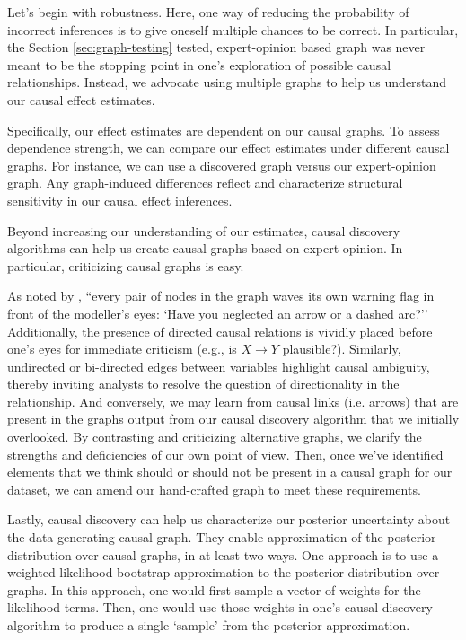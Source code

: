 Let's begin with robustness.
Here, one way of reducing the probability of incorrect inferences is to give oneself multiple chances to be correct.
In particular, the Section \ref{sec:graph-testing} tested, expert-opinion based graph was never meant to be the stopping point in one's exploration of possible causal relationships.
Instead, we advocate using multiple graphs to help us understand our causal effect estimates.

Specifically, our effect estimates are dependent on our causal graphs.
To assess dependence strength, we can compare our effect estimates under different causal graphs.
For instance, we can use a discovered graph versus our expert-opinion graph.
Any graph-induced differences reflect and characterize structural sensitivity in our causal effect inferences.

Beyond increasing our understanding of our estimates, causal discovery algorithms can help us create causal graphs based on expert-opinion.
In particular, criticizing causal graphs is easy.

As noted by \citet[p. 708]{pearl_1995_causal}, ``every pair of nodes in the graph waves its own warning flag in front of the modeller's eyes: `Have you neglected an arrow or a dashed arc?''
Additionally, the presence of directed causal relations is vividly placed before one's eyes for immediate criticism (e.g., is $X \rightarrow Y$ plausible?).
Similarly, undirected or bi-directed edges between variables highlight causal ambiguity, thereby inviting analysts to resolve the question of directionality in the relationship.
And conversely, we may learn from causal links (i.e. arrows) that are present in the graphs output from our causal discovery algorithm that we initially overlooked.
By contrasting and criticizing alternative graphs, we clarify the strengths and deficiencies of our own point of view.
Then, once we've identified elements that we think should or should not be present in a causal graph for our dataset, we can amend our hand-crafted graph to meet these requirements.

Lastly, causal discovery can help us characterize our posterior uncertainty about the data-generating causal graph.
They enable approximation of the posterior distribution over causal graphs, in at least two ways.
One approach is to use a weighted likelihood bootstrap approximation \citep{newton_1994_approximate} to the posterior distribution over graphs.
In this approach, one would first sample a vector of weights for the likelihood terms.
Then, one would use those weights in one's causal discovery algorithm to produce a single `sample' from the posterior approximation.

